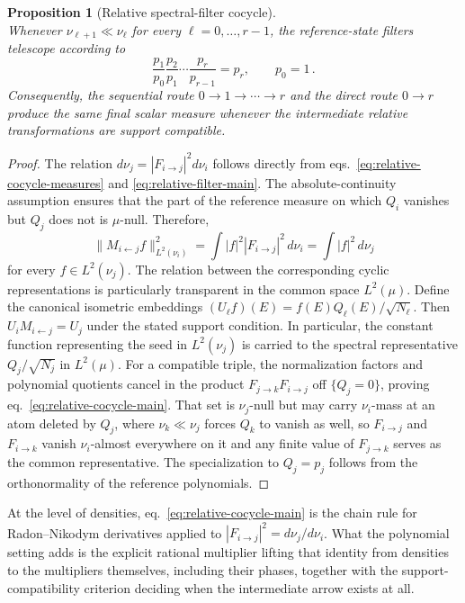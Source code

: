 \documentclass[a4paper,11pt]{article}
\def\dd{d}%
\newtheorem{proposition}{Proposition}[section]
\theoremstyle{definition}
\theoremstyle{remark}
\newcommand{\dd}{\mathrm d}
\begin{document}
\begin{proposition}[Relative spectral-filter cocycle]
\begin{equation}
   \label{eq:reference-state-relative-filter-main}
\end{equation}
Whenever $\nu_{\ell+1}\ll\nu_\ell$ for every $\ell=0,\ldots,r-1$, the reference-state filters telescope according to
\begin{equation}
   \frac{p_1}{p_0}
   \frac{p_2}{p_1}\cdots
   \frac{p_r}{p_{r-1}}
   =
   p_r,
   \qquad p_0=1\,.
   \label{eq:reference-state-telescope-main}
\end{equation}
Consequently, the sequential route
$0\to1\to\cdots\to r$ and the direct route $0\to r$ produce the same final scalar measure whenever the intermediate relative transformations are support compatible.
\end{proposition}

\begin{proof}
The relation
$\dd\nu_j=|F_{i\to j}|^2\dd\nu_i$ follows directly from
eqs.~\eqref{eq:relative-cocycle-measures} and
\eqref{eq:relative-filter-main}. The absolute-continuity assumption ensures that the part of the reference measure on which $Q_i$ vanishes but $Q_j$ does not is $\mu$-null. Therefore,
\begin{equation}
   \|M_{i\leftarrow j}f\|_{L^2(\nu_i)}^2
   =
   \int |f|^2|F_{i\to j}|^2\,\dd\nu_i
   =
   \int |f|^2\,\dd\nu_j
\end{equation}
for every $f\in L^2(\nu_j)$. The relation between the corresponding cyclic representations is particularly transparent in the common space $L^2(\mu)$. Define the canonical isometric embeddings
$
   (U_\ell f)(E)=f(E)Q_\ell(E)/\sqrt{N_\ell}.
$
Then
$
   U_iM_{i\leftarrow j}=U_j
$
under the stated support condition. In particular, the constant function representing the seed in $L^2(\nu_j)$ is carried to the spectral representative $Q_j/\sqrt{N_j}$ in $L^2(\mu)$. For a compatible triple, the normalization factors and polynomial quotients cancel in the product
$F_{j\to k}F_{i\to j}$ off $\{Q_j=0\}$, proving
eq.~\eqref{eq:relative-cocycle-main}. That set is $\nu_j$-null but may carry $\nu_i$-mass at an atom deleted by $Q_j$, where $\nu_k\ll\nu_j$ forces $Q_k$ to vanish as well, so $F_{i\to j}$ and $F_{i\to k}$ vanish $\nu_i$-almost everywhere on it and any finite value of $F_{j\to k}$ serves as the common representative. The specialization to
$Q_j=p_j$ follows from the orthonormality of the reference polynomials.
\end{proof}

At the level of densities, eq.~\eqref{eq:relative-cocycle-main} is the chain rule for Radon--Nikodym derivatives \cite{Folland1999} applied to $|F_{i\to j}|^2=\dd\nu_j/\dd\nu_i$. What the polynomial setting adds is the explicit rational multiplier lifting that identity from densities to the multipliers themselves, including their phases, together with the support-compatibility criterion deciding when the intermediate arrow exists at all.
\end{document}
